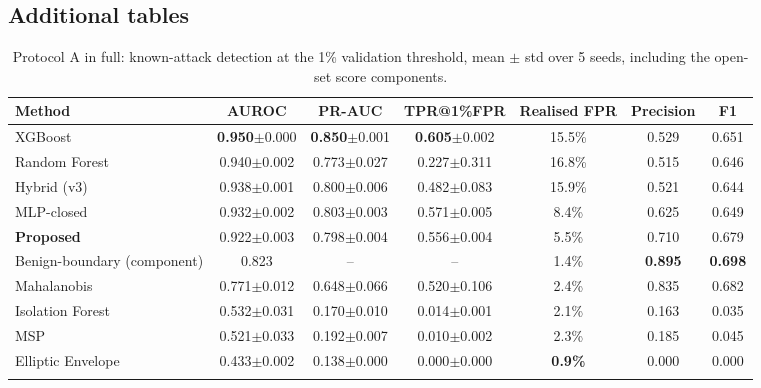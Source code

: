 \documentclass[pdflatex,sn-mathphys-num,iicol]{sn-jnl}%
\begin{document}
\begin{appendices}

\section{Additional tables}\label{app:tables}

\begin{table}[!htbp]
\caption{Protocol A in full: known-attack detection at the 1\% validation threshold, mean $\pm$ std over 5 seeds, including the open-set score components.}\label{tab:A1}
\footnotesize
\begin{tabular}{@{}lcccccc@{}}
\toprule
Method & AUROC & PR-AUC & TPR@1\%FPR & Realised FPR & Precision & F1 \\
\midrule
XGBoost & \textbf{0.950}$\pm$0.000 & \textbf{0.850}$\pm$0.001 & \textbf{0.605}$\pm$0.002 & 15.5\% & 0.529 & 0.651 \\
Random Forest & 0.940$\pm$0.002 & 0.773$\pm$0.027 & 0.227$\pm$0.311 & 16.8\% & 0.515 & 0.646 \\
Hybrid (v3) & 0.938$\pm$0.001 & 0.800$\pm$0.006 & 0.482$\pm$0.083 & 15.9\% & 0.521 & 0.644 \\
MLP-closed & 0.932$\pm$0.002 & 0.803$\pm$0.003 & 0.571$\pm$0.005 & 8.4\% & 0.625 & 0.649 \\
\textbf{Proposed} & 0.922$\pm$0.003 & 0.798$\pm$0.004 & 0.556$\pm$0.004 & 5.5\% & 0.710 & 0.679 \\
Benign-boundary (component) & 0.823 & -- & -- & 1.4\% & \textbf{0.895} & \textbf{0.698} \\
Mahalanobis & 0.771$\pm$0.012 & 0.648$\pm$0.066 & 0.520$\pm$0.106 & 2.4\% & 0.835 & 0.682 \\
Isolation Forest & 0.532$\pm$0.031 & 0.170$\pm$0.010 & 0.014$\pm$0.001 & 2.1\% & 0.163 & 0.035 \\
MSP & 0.521$\pm$0.033 & 0.192$\pm$0.007 & 0.010$\pm$0.002 & 2.3\% & 0.185 & 0.045 \\
Elliptic Envelope & 0.433$\pm$0.002 & 0.138$\pm$0.000 & 0.000$\pm$0.000 & \textbf{0.9\%} & 0.000 & 0.000 \\
\botrule
\end{tabular}
\end{table}


\end{appendices}
\end{document}
